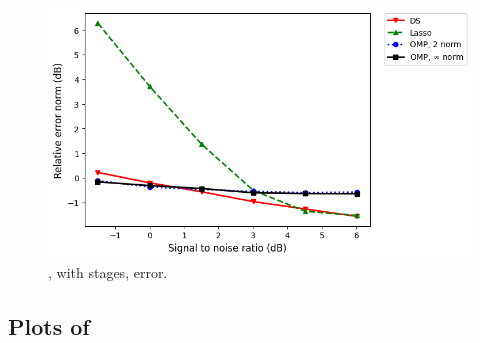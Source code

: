 %
\begin {figure} [H]
\includegraphics [width = 0.8 \textwidth] {error-big-more-tall-six-usual.png}
\caption {, with  stages, error.}
\end {figure}

\subsection {Plots of }


